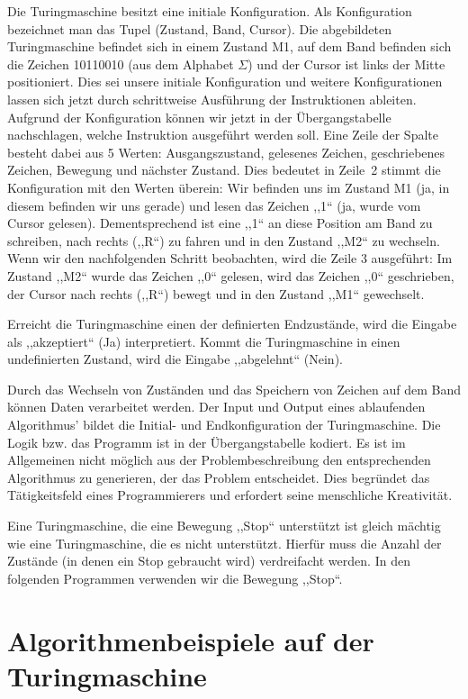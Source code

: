 Die Turingmaschine besitzt eine initiale Konfiguration. Als Konfiguration bezeichnet man das Tupel (Zustand, Band, Cursor). Die abgebildeten Turingmaschine befindet sich in einem Zustand M1, auf dem Band befinden sich die Zeichen 10110010 (aus dem Alphabet $\Sigma$) und der Cursor ist links der Mitte positioniert. Dies sei unsere initiale Konfiguration und weitere Konfigurationen lassen sich jetzt durch schrittweise Ausführung der Instruktionen ableiten. \\
Aufgrund der Konfiguration können wir jetzt in der Übergangstabelle nachschlagen, welche Instruktion ausgeführt werden soll. Eine Zeile der Spalte besteht dabei aus 5 Werten: Ausgangszustand, gelesenes Zeichen, geschriebenes Zeichen, Bewegung und nächster Zustand. Dies bedeutet in Zeile~2 stimmt die Konfiguration mit den Werten überein: Wir befinden uns im Zustand M1 (ja, in diesem befinden wir uns gerade) und lesen das Zeichen ,,1`` (ja, wurde vom Cursor gelesen). Dementsprechend ist eine ,,1`` an diese Position am Band zu schreiben, nach rechts (,,R``) zu fahren und in den Zustand ,,M2`` zu wechseln. Wenn wir den nachfolgenden Schritt beobachten, wird die Zeile 3 ausgeführt: Im Zustand ,,M2`` wurde das Zeichen ,,0`` gelesen, wird das Zeichen ,,0`` geschrieben, der Cursor nach rechts (,,R``) bewegt und in den Zustand ,,M1`` gewechselt.

Erreicht die Turingmaschine einen der definierten Endzustände, wird die Eingabe als ,,akzeptiert`` (Ja) interpretiert. Kommt die Turingmaschine in einen undefinierten Zustand, wird die Eingabe ,,abgelehnt`` (Nein).

Durch das Wechseln von Zuständen und das Speichern von Zeichen auf dem Band können Daten verarbeitet werden. Der Input und Output eines ablaufenden Algorithmus' bildet die Initial- und Endkonfiguration der Turingmaschine. Die Logik bzw. das Programm ist in der Übergangstabelle kodiert. Es ist im Allgemeinen nicht möglich aus der Problembeschreibung den entsprechenden Algorithmus zu generieren, der das Problem entscheidet. Dies begründet das Tätigkeitsfeld eines Programmierers und erfordert seine menschliche Kreativität.

Eine Turingmaschine, die eine Bewegung ,,Stop`` unterstützt ist gleich mächtig wie eine Turingmaschine, die es nicht unterstützt. Hierfür muss die Anzahl der Zustände (in denen ein Stop gebraucht wird) verdreifacht werden. In den folgenden Programmen verwenden wir die Bewegung ,,Stop``.

\section{Algorithmenbeispiele auf der Turingmaschine}
